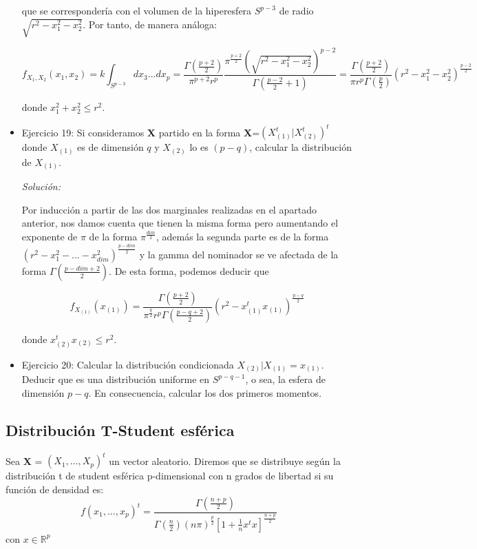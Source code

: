 \documentclass{article}
\theoremstyle{theorem-style}  %
\theoremstyle{definition}
\theoremstyle{example-style}
\begin{document}
\begin{itemize}
		que se correspondería con el volumen de la hiperesfera $S^{p-3}$ de radio $\sqrt{r^2 - x_1^2 - x_2^2}$. Por tanto, de manera análoga:
		
		\[
				f_{X_1, X_2}(x_1, x_2) = k \int_{S^{p-3}} dx_3 ... dx_p = \frac{\Gamma(\frac{p+2}{2})}{\pi^{p+2} r^p} \frac{\pi^{\frac{p+2}{2}}  (\sqrt{r^2 - x_1^2 - x_2 ^2})^{p-2} }{ \Gamma(\frac{p-2}{2} + 1)} = \frac{\Gamma(\frac{p+2}{2})}{\pi r^p \Gamma(\frac{p}{2})} (r^2 - x_1^2 - x_2 ^ 2) ^{\frac{p-2}{2}}
		\]
		
		donde $x_1^2 + x_2^2 \leq r^2$.
		
		\item Ejercicio 19: Si consideramos \textbf{X} partido en la forma \textbf{X}=$(X^t_{(1)}|X^t_{(2)})^t$ donde $X_{(1)}$ es de dimensión $q$ y $X_{(2)}$ lo es $(p-q)$, calcular la distribución de $X_{(1)}$.
		
		\textit{Solución: }
		
		Por inducción a partir de las dos marginales realizadas en el apartado anterior, nos damos cuenta que tienen la misma forma pero aumentando el exponente de $\pi$ de la forma $\pi^{\frac{dim}{2}}$, además la segunda parte es de la forma $(r^2 - x_1^2 - ... - x_{dim}^2)^{\frac{p-dim}{2}}$ y la gamma del nominador se ve afectada de la forma $\Gamma(\frac{p-dim+2}{2})$. De esta forma, podemos deducir que
		
		\[
			f_{X_{(1)}}(x_{(1)}) = \frac{\Gamma(\frac{p+2}{2})}{\pi^{\frac{q}{2}} r^p \Gamma(\frac{p-q+2}{2})} (r^2 -x_{(1)}^t x_{(1)}) ^{\frac{p-q}{2}}
		\] 
		
		donde $x_{(2)}^t x_{(2)} \leq r^2$.
		
		
		
		\item Ejercicio 20: Calcular la distribución condicionada $X_{(2)}|X_{(1)} = x_{(1)}$. Deducir que es una distribución uniforme en $S^{p-q-1}$, o sea, la esfera de dimensión $p-q$. En consecuencia, calcular los dos primeros momentos.
	\end{itemize}
	
	\subsection{Distribución T-Student esférica}
	
	Sea \textbf{X} = $(X_1, \dots , X_p)^t$ un vector aleatorio. Diremos que se distribuye según la distribución t de student esférica p-dimensional con n grados de libertad si su función de densidad es:
	$$ f(x_1, \dots, x_p)^t = \frac{\Gamma(\frac{n+p}{2})}{\Gamma(\frac{n}{2})(n \pi )^{\frac{p}{2}}[1+\frac{1}{n}x^tx]^{\frac{n+p}{2}}} $$ con $x \in \mathbb{R}^p$
	
\end{document}
